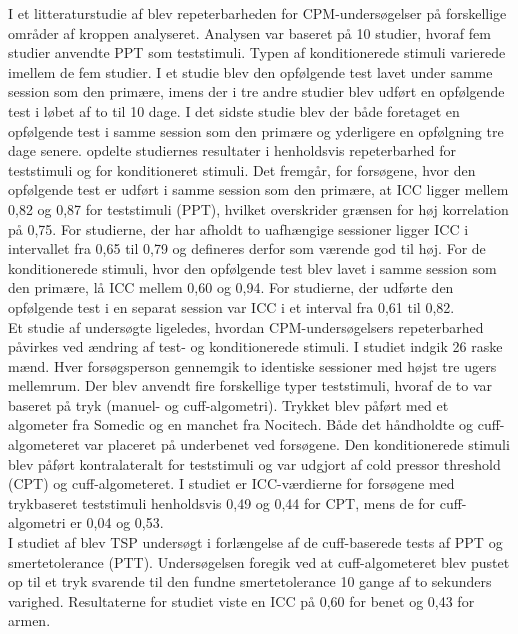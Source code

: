I et litteraturstudie af  blev repeterbarheden for CPM-undersøgelser på forskellige områder af kroppen analyseret. Analysen var baseret på 10 studier, hvoraf fem studier anvendte PPT som teststimuli. Typen af konditionerede stimuli varierede imellem de fem studier. I et studie blev den opfølgende test lavet under samme session som den primære, imens der i tre andre studier blev udført en opfølgende test i løbet af to til 10 dage. I det sidste studie blev der både foretaget en opfølgende test i samme session som den primære og yderligere en opfølgning tre dage senere.  opdelte studiernes resultater i henholdsvis repeterbarhed for teststimuli og for konditioneret stimuli. Det fremgår, for forsøgene, hvor den opfølgende test er udført i samme session som den primære, at ICC ligger mellem 0,82 og 0,87 for teststimuli (PPT), hvilket overskrider grænsen for høj korrelation på 0,75. For studierne, der har afholdt to uafhængige sessioner ligger ICC i intervallet fra 0,65 til 0,79 og defineres derfor som værende god til høj. For de konditionerede stimuli, hvor den opfølgende test blev lavet i samme session som den primære, lå ICC mellem 0,60 og 0,94. For studierne, der udførte den opfølgende test i en separat session var ICC i et interval fra 0,61 til 0,82.\\ 
Et studie af  undersøgte ligeledes, hvordan CPM-undersøgelsers repeterbarhed påvirkes ved ændring af test- og konditionerede stimuli. I studiet indgik 26 raske mænd. Hver forsøgsperson gennemgik to identiske sessioner med højst tre ugers mellemrum. Der blev anvendt fire forskellige typer teststimuli, hvoraf de to var baseret på tryk (manuel- og cuff-algometri). Trykket blev påført med et algometer fra Somedic og en manchet fra Nocitech. Både det håndholdte og cuff-algometeret var placeret på underbenet ved forsøgene. Den konditionerede stimuli blev påført kontralateralt for teststimuli og var udgjort af cold pressor threshold (CPT) og cuff-algometeret. I studiet er ICC-værdierne for forsøgene med trykbaseret teststimuli henholdsvis 0,49 og 0,44 for CPT, mens de for cuff-algometri er 0,04 og 0,53.\\ 
I studiet af  blev TSP undersøgt i forlængelse af de cuff-baserede tests af PPT og smertetolerance (PTT). Undersøgelsen foregik ved at cuff-algometeret blev pustet op til et tryk svarende til den fundne smertetolerance 10 gange af to sekunders varighed. Resultaterne for studiet viste en ICC på 0,60 for benet og 0,43 for armen. 

